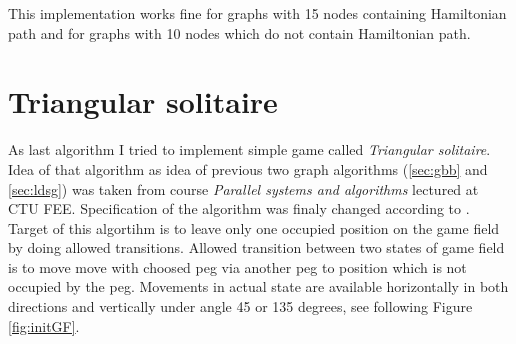 \documentclass[11pt,twoside,a4paper]{book}
\begin{document}
This implementation works fine for graphs with 15 nodes containing Hamiltonian
path and for graphs with 10 nodes which do not contain Hamiltonian path.

\section{Triangular solitaire}
As last algorithm I tried to implement simple game called  \textit{Triangular
solitaire}. Idea of that algorithm as idea of previous two graph
algorithms (\ref{sec:gbb} and \ref{sec:ldsg}) was taken from course
\textit{Parallel systems and algorithms} lectured at CTU FEE. Specification of
the algorithm was finaly changed according to \cite{web:mathIsFun}. Target of
this algortihm is to leave only one occupied position on the game field by doing
allowed transitions. Allowed transition between two states of game field is to
move move with choosed peg via another peg to position which is not occupied by
the peg. Movements in actual state are available horizontally in both directions
and vertically under angle 45 or 135 degrees, see following Figure
\ref{fig:initGF}.
\end{document}
